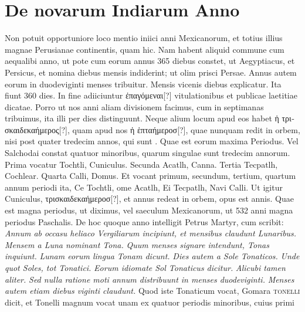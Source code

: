\section{De novarum Indiarum Anno}
Non potuit opportuniore loco mentio iniici anni Mexicanorum,
et totius illius magnae Perusianae continentis, quam hic.
%
Nam habent aliquid commune cum aequalibi anno, ut pote cum
eorum annus 365 diebus constet, ut Aegyptiacus, et Persicus, et nomina
diebus mensis indiderint; ut olim prisci Persae.
Annus autem
eorum in duodeviginti menses tribuitur.
Mensis vicenis diebus explicatur.
Ita fiunt 360 dies.
In fine adiiciuntur \textgreek{ἐπαγόμεναι}[?] vitulationibus
et publicae laetitiae dicatae.
Porro ut nos anni aliam divisionem
facimus, cum in septimanas tribuimus, ita illi per  dies distinguunt.
Neque alium locum apud eos habet
 \textgreek{ἡ τρισκαιδεκαήμερος}[?], quam
apud nos \textgreek{ἡ ἑπταήμεροσ}[?],
 quae nunquam redit in orbem, nisi post quater
tredecim annos, qui sunt .
Quae est eorum maxima Periodus.
Vel
Salchodai constat quatuor minoribus, quarum singulae sunt tredecim
annorum.
Prima vocatur Tochtli, Cuniculus.
Secunda Acatlh,
Canna.
Tertia Tecpatlh, Cochlear.
Quarta Calli, Domus.
Et vocant
primum, secundum, tertium, quartum annum periodi ita, Ce Tochtli,
ome Acatlh, Ei Tecpatlh, Navi Calli.
Ut igitur Cuniculus,
\textgreek{τρισκαιδεκαήμεροσ}[?], et annus redeat in orbem, opus est
  annis.
Quae
est magna periodus, ut diximus, vel saeculum Mexicanorum, ut 532
anni magna periodus Paschalis.
De hoc quoque anno intelligit Petrus
Martyr, cum scribit: \textit{Annum ab occasu heliaco Vergiliarum incipiunt,
et mensibus claudunt Lunaribus.}
\textit{Mensem a Luna nominant
Tona.}
\textit{Quum menses signare intendunt, Tonas inquiunt.}
\textit{Lunam
eorum lingua Tonam dicunt.}
\textit{Dies autem a Sole Tonaticos.}
\textit{Unde quot Soles, tot Tonatici.}
\textit{Eorum idiomate Sol Tonaticus dicitur.}
\textit{Alicubi tamen aliter.}
\textit{Sed nulla ratione moti annum distribuunt
in menses duodeviginti.}
\textit{Menses autem etiam diebus viginti claudunt.}
Quod iste Tonaticum vocat, Gomara \textsc{tonelli} dicit, et Tonelli
magnum vocat unam ex quatuor periodis minoribus, cuius primi
